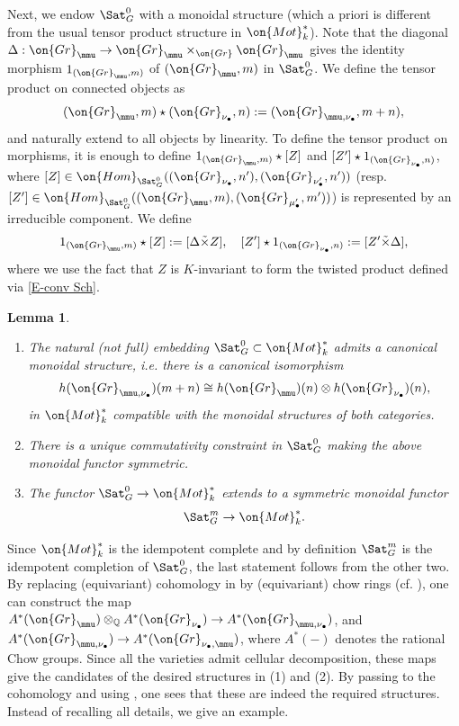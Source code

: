 \documentclass[11pt]{amsart}
\newtheorem{lem}[thm]{Lemma}
\theoremstyle{definition}
\theoremstyle{definition}
\theoremstyle{definition}
\numberwithin{equation}{subsection}
\newcommand{\bQ}{{\mathbb Q}}
\newcommand{\Gr}{{\on{Gr}}}
\newcommand{\Hom}{{\on{Hom}}}
\begin{document}
Next, we endow $\Sat_G^{0}$ with a monoidal structure (which a priori is different from the usual tensor product structure in $\on{Mot}_k^*$).
Note that the diagonal $\Delta: \Gr_{\mmu}\to \Gr_{\mmu}\times_{\Gr}\Gr_{\mmu}$ gives the identity morphism $1_{(\Gr_\mmu,m)}$ of $(\Gr_\mmu,m)$ in $\Sat_G^{0}$.
We define the tensor product on connected objects as
\[(\Gr_{\mmu},m)\star (\Gr_{\nu_\bullet},n):=(\Gr_{\mmu,\nu_\bullet},m+n),\]
and naturally extend to all objects by linearity.
To define the tensor product on morphisms, it is enough to define $1_{(\Gr_{\mmu},m)}\star [Z]$ and $[Z']\star 1_{(\Gr_{\nu_\bullet},n)}$, where $[Z]\in \Hom_{\Sat_G^{0}}((\Gr_{\nu_\bullet},n'), (\Gr_{\nu'_\bullet},n'))$ (resp. $[Z'] \in \Hom_{\Sat_G^{0}}((\Gr_\mmu,m), (\Gr_{\mu'_\bullet},m'))$) is represented by an irreducible component. We define
$$1_{(\Gr_{\mmu},m)}\star [Z]:=[\Delta\tilde\times Z],\quad [Z']\star 1_{(\Gr_{\nu_\bullet},n)}:=[Z'\tilde\times\Delta],$$
where we use the fact that $Z$ is $K$-invariant to form the twisted product defined via \eqref{E-conv Sch}.

\begin{lem}
\begin{enumerate}
\item The natural (not full) embedding $\Sat_G^0\subset\on{Mot}_k^*$ admits a canonical monoidal structure, i.e. there is a canonical isomorphism
\[h(\Gr_{\mmu,\nu_\bullet})(m+n)\cong h(\Gr_{\mmu})(n)\otimes h(\Gr_{\nu_\bullet})(n),\]
in $\on{Mot}^*_k$ compatible with the monoidal structures of both categories.
\item There is a unique commutativity constraint in $\Sat_G^{0}$ making the above monoidal functor symmetric. 
\item The functor $\Sat_G^0\to\on{Mot}^*_k$ extends to a symmetric monoidal functor 
$$\Sat_G^m\to \on{Mot}_k^*.$$ 
\end{enumerate}
\end{lem}
Since $\on{Mot}^*_k$ is the idempotent complete and by definition $\Sat_G^m$ is the idempotent completion of $\Sat_G^0$, the last statement follows from the other two.
By replacing (equivariant) cohomology in \cite[\S 2.3, \S 2.4]{Zh1} by (equivariant) chow rings (cf. \cite{EG}), one can construct the 
map $A^*(\Gr_{\mmu})\otimes_{\bQ}A^*(\Gr_{\nu_\bullet})\to A^*(\Gr_{\mmu,\nu_\bullet})$, and $A^*(\Gr_{\mmu,\nu_\bullet})\to A^*(\Gr_{\nu_\bullet,\mmu})$, where $A^*(-)$ denotes the rational Chow groups. Since all the varieties admit cellular decomposition, these maps give the candidates of the desired structures in (1) and (2).
By passing to the cohomology and using \cite[\S 2.3, \S 2.4]{Zh1}, one sees that these are indeed the required structures.
Instead of recalling all details, we give an example.
\end{document}

